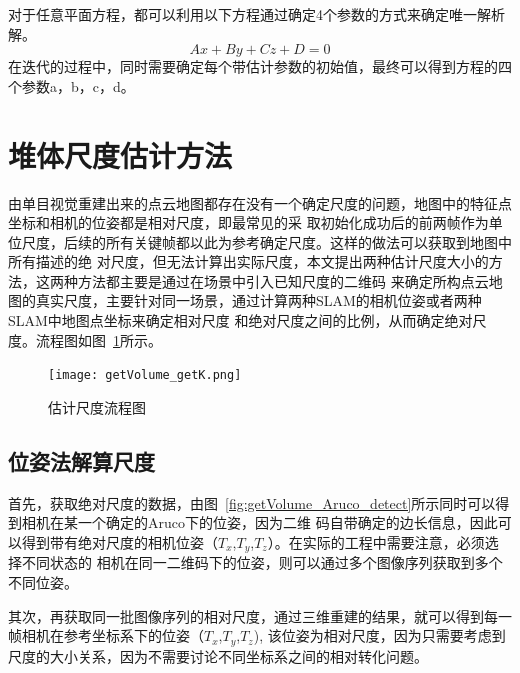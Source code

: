 对于任意平面方程，都可以利用以下方程通过确定4个参数的方式来确定唯一解析解。
\begin{equation}Ax+By+Cz+D= 0\label{equ:plane}\end{equation}
在迭代的过程中，同时需要确定每个带估计参数的初始值，最终可以得到方程的四个参数a，b，c，d。

\section{堆体尺度估计方法}
\label{sec:4.3}
由单目视觉重建出来的点云地图都存在没有一个确定尺度的问题，地图中的特征点坐标和相机的位姿都是相对尺度，即最常见的采
取初始化成功后的前两帧作为单位尺度，后续的所有关键帧都以此为参考确定尺度。这样的做法可以获取到地图中所有描述的绝
对尺度，但无法计算出实际尺度，本文提出两种估计尺度大小的方法，这两种方法都主要是通过在场景中引入已知尺度的二维码
来确定所构点云地图的真实尺度，主要针对同一场景，通过计算两种SLAM的相机位姿或者两种SLAM中地图点坐标来确定相对尺度
和绝对尺度之间的比例，从而确定绝对尺度。流程图如图~\ref{fig:getVolume_getK}所示。
\begin{figure}[H] %
  \centering
  \texttt{[image: getVolume\_getK.png]}
  \caption{估计尺度流程图}
  \label{fig:getVolume_getK}
\end{figure}
\subsection{位姿法解算尺度}
首先，获取绝对尺度的数据，由图~\ref{fig:getVolume_Aruco_detect}所示同时可以得到相机在某一个确定的Aruco下的位姿，因为二维
码自带确定的边长信息，因此可以得到带有绝对尺度的相机位姿（$T_x$,$T_y$,$T_z$）。在实际的工程中需要注意，必须选择不同状态的
相机在同一二维码下的位姿，则可以通过多个图像序列获取到多个不同位姿。

其次，再获取同一批图像序列的相对尺度，通过三维重建的结果，就可以得到每一帧相机在参考坐标系下的位姿（$T_x$,$T_y$,$T_z$),
该位姿为相对尺度，因为只需要考虑到尺度的大小关系，因为不需要讨论不同坐标系之间的相对转化问题。

